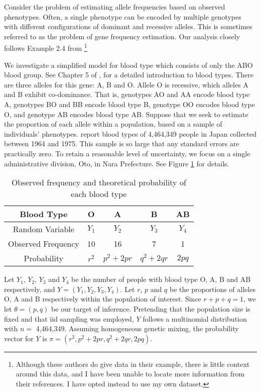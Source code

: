 \documentclass[11pt, oneside]{article}   	%
\begin{document}
Consider the problem of estimating allele frequencies based on observed phenotypes. Often, a single phenotype can be encoded by multiple genotypes with different configurations of dominant and recessive alleles. This is sometimes referred to as the problem of gene frequency estimation. Our analysis closely follows Example 2.4 from \citet{McL08}\footnote{Although these authors do give data in their example, there is little context around this data, and I have been unable to locate more information from their references. I have opted instead to use my own dataset.}

We investigate a simplified model for blood type which consists of only the ABO blood group. See Chapter 5 of \citet{Dea05}, for a detailed introduction to blood types. There are three alleles for this gene: A, B and O. Allele O is recessive, which alleles A and B exhibit co-dominance. That is, genotypes AO and AA encode blood type A, genotypes BO and BB encode blood type B, genotype OO encodes blood type O, and genotype AB encodes blood type AB. Suppose that we seek to estimate the proportion of each allele within a population, based on a sample of individuals' phenotypes. \citet{Fuj78} report blood types of 4,464,349 people in Japan collected between 1964 and 1975. This sample is so large that any standard errors are practically zero. To retain a reasonable level of uncertainty, we focus on a single administrative division, Oto, in Nara Prefecture. See Figure \ref{tab:blood_type} for details.

\begin{table}
    \centering
    \caption{Observed frequency and theoretical probability of each blood type \citep{Fuj78}}
    \begin{tabular}{c|cccc}
        Blood Type & O & A & B & AB\\
        \hline
        Random Variable & $Y_1$ & $Y_2$ & $Y_3$ & $Y_4$\\
        Observed Frequency & 10 & 16 & 7 & 1\\
        Probability & $r^2$ & $p^2 + 2pr$ & $q^2 + 2qr$ & $2pq$
    \end{tabular}
    \label{tab:blood_type}
\end{table}

Let $Y_1$, $Y_2$, $Y_3$ and $Y_4$ be the number of people with blood type O, A, B and AB respectively, and $Y = (Y_1, Y_2, Y_3, Y_4)$. Let $r$, $p$ and $q$ be the proportions of alleles O, A and B respectively within the population of interest. Since $r + p + q = 1$, we let $\theta = (p, q)$ be our target of inference. Pretending that the population size is fixed and that iid sampling was employed, $Y$ follows a multinomial distribution with $n =$ 4,464,349. Assuming homogeneous genetic mixing, the probability vector for $Y$ is $\pi = (r^2, p^2 + 2pr, q^2 + 2qr, 2pq)$.
\end{document}
